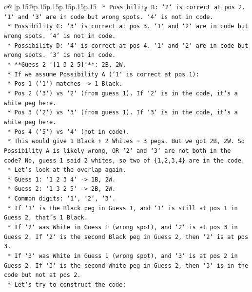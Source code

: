\documentclass{article}
\begin{document}
{\begin{supertabular}{c@{$\;$}|p{.15\linewidth}@{}p{.15\linewidth}p{.15\linewidth}p{.15\linewidth}p{.15\linewidth}p{.15\linewidth}}
{{{\texttt{            *   Possibility B: `2` is correct at pos 2. `1` and `3` are in code but wrong spots. `4` is not in code.} \\
\texttt{            *   Possibility C: `3` is correct at pos 3. `1` and `2` are in code but wrong spots. `4` is not in code.} \\
\texttt{            *   Possibility D: `4` is correct at pos 4. `1` and `2` are in code but wrong spots. `3` is not in code.} \\
\texttt{        *   **Guess 2 `{[}1 3 2 5{]}`**: 2B, 2W.} \\
\texttt{            *   If we assume Possibility A (`1` is correct at pos 1):} \\
\texttt{                *   Pos 1 (`1`) matches {-}> 1 Black.} \\
\texttt{                *   Pos 2 (`3`) vs `2` (from guess 1). If `2` is in the code, it's a white peg here.} \\
\texttt{                *   Pos 3 (`2`) vs `3` (from guess 1). If `3` is in the code, it's a white peg here.} \\
\texttt{                *   Pos 4 (`5`) vs `4` (not in code).} \\
\texttt{                *   This would give 1 Black + 2 Whites = 3 pegs. But we got 2B, 2W. So Possibility A is likely wrong, OR `2` and `3` are not both in the code? No, guess 1 said 2 whites, so two of \{1,2,3,4\} are in the code.} \\
\texttt{            *   Let's look at the overlap again.} \\
\texttt{            *   Guess 1: `1 2 3 4` {-}> 1B, 2W.} \\
\texttt{            *   Guess 2: `1 3 2 5` {-}> 2B, 2W.} \\
\texttt{            *   Common digits: `1`, `2`, `3`.} \\
\texttt{            *   If `1` is the Black peg in Guess 1, and `1` is still at pos 1 in Guess 2, that's 1 Black.} \\
\texttt{            *   If `2` was White in Guess 1 (wrong spot), and `2` is at pos 3 in Guess 2. If `2` is the second Black peg in Guess 2, then `2` is at pos 3.} \\
\texttt{            *   If `3` was White in Guess 1 (wrong spot), and `3` is at pos 2 in Guess 2. If `3` is the second White peg in Guess 2, then `3` is in the code but not at pos 2.} \\
\texttt{            *   Let's try to construct the code:} \\
}}}
\end{supertabular}}
\end{document}
